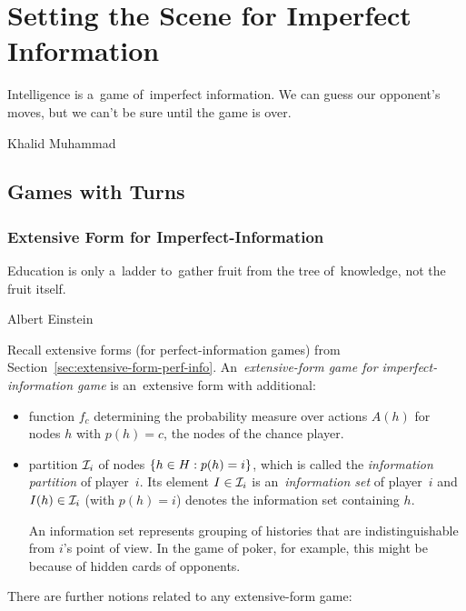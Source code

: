 \chapter{Setting the Scene for Imperfect Information}
\epigraph{
  Intelligence is a~game of~imperfect information.
  We can guess our opponent's moves, but we can't be sure until the game is over.
}{Khalid Muhammad}

\section{Games with Turns}

\subsection{Extensive Form for Imperfect-Information}
\label{ssec:extensive-form-imperf-info}
\epigraph{
  Education is only a~ladder to~gather fruit from the tree of~knowledge, not the fruit itself.
}{Albert Einstein}
Recall extensive forms (for perfect-information games) from Section~\ref{sec:extensive-form-perf-info}.
An~\emph{extensive-form game for imperfect-information game} is an~extensive form with additional:
\begin{itemize}
  \item function $f_c$ determining the probability measure over actions $A(h)$ for nodes $h$ with $p(h) = c$, the nodes of the chance player.

  \item partition $\mathcal{I}_i$ of nodes $\left\{ h \in H: p(h) = i \right\}$, which is called the \emph{information partition} of player~$i$.
    Its element $I \in \mathcal{I}_i$ is an~\emph{information set} of player~$i$ and $I(h) \in \mathcal{I}_i$ (with $p(h) = i$) denotes the information set containing $h$.

    An information set represents grouping of histories that are indistinguishable from $i$'s point of view.
    In the game of poker, for example, this might be because of hidden cards of opponents.
\end{itemize}

There are further notions related to any extensive-form game:

